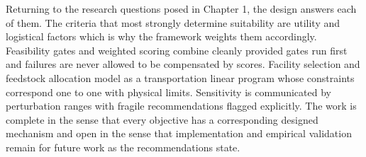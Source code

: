 \documentclass[12pt,a4paper]{report}
\begin{document}
Returning to the research questions posed in Chapter 1, the design
answers each of them. The criteria that most strongly determine
suitability are utility and logistical factors which is why the
framework weights them accordingly. Feasibility gates and weighted
scoring combine cleanly provided gates run first and failures are
never allowed to be compensated by scores. Facility selection and
feedstock allocation model as a transportation linear program whose
constraints correspond one to one with physical limits. Sensitivity
is communicated by perturbation ranges with fragile recommendations
flagged explicitly. The work is complete in the sense that every
objective has a corresponding designed mechanism and open in the
sense that implementation and empirical validation remain for future
work as the recommendations state.
\end{document}
